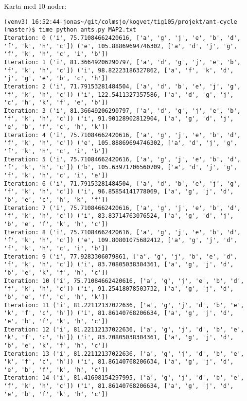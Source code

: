 \documentclass[english,man]{apa6}
\begin{document}
Karta med 10 noder:

\begin{verbatim}
(venv3) 16:52:44-jonas~/git/colmsjo/kogvet/tig105/projekt/ant-cycle (master)$ time python ants.py MAP2.txt
Iteration: 0 ('i', 75.71084662420616, ['a', 'g', 'j', 'e', 'b', 'd', 'f', 'k', 'h', 'c']) ('e', 105.88869694746302, ['a', 'd', 'j', 'g', 'f', 'k', 'h', 'c', 'i', 'b'])
Iteration: 1 ('i', 81.36649206290797, ['a', 'd', 'g', 'j', 'e', 'b', 'f', 'k', 'h', 'c']) ('i', 98.82223186327862, ['a', 'f', 'k', 'd', 'j', 'g', 'e', 'b', 'c', 'h'])
Iteration: 2 ('i', 71.79153281484504, ['a', 'd', 'b', 'e', 'j', 'g', 'f', 'k', 'h', 'c']) ('i', 122.5411327357586, ['a', 'd', 'g', 'j', 'c', 'h', 'k', 'f', 'e', 'b'])
Iteration: 3 ('i', 81.36649206290797, ['a', 'd', 'g', 'j', 'e', 'b', 'f', 'k', 'h', 'c']) ('i', 91.90128902812904, ['a', 'g', 'd', 'j', 'e', 'b', 'f', 'c', 'h', 'k'])
Iteration: 4 ('i', 75.71084662420616, ['a', 'g', 'j', 'e', 'b', 'd', 'f', 'k', 'h', 'c']) ('e', 105.88869694746302, ['a', 'd', 'j', 'g', 'f', 'k', 'h', 'c', 'i', 'b'])
Iteration: 5 ('i', 75.71084662420616, ['a', 'g', 'j', 'e', 'b', 'd', 'f', 'k', 'h', 'c']) ('b', 105.63971706560709, ['a', 'd', 'j', 'g', 'f', 'k', 'h', 'c', 'i', 'e'])
Iteration: 6 ('i', 71.79153281484504, ['a', 'd', 'b', 'e', 'j', 'g', 'f', 'k', 'h', 'c']) ('i', 96.85854141778069, ['a', 'g', 'j', 'd', 'b', 'e', 'c', 'h', 'k', 'f'])
Iteration: 7 ('i', 75.71084662420616, ['a', 'g', 'j', 'e', 'b', 'd', 'f', 'k', 'h', 'c']) ('i', 83.83714763076524, ['a', 'g', 'd', 'j', 'b', 'e', 'f', 'k', 'h', 'c'])
Iteration: 8 ('i', 75.71084662420616, ['a', 'g', 'j', 'e', 'b', 'd', 'f', 'k', 'h', 'c']) ('e', 109.80801075682412, ['a', 'g', 'j', 'd', 'f', 'k', 'h', 'c', 'i', 'b'])
Iteration: 9 ('i', 77.9283306079861, ['a', 'g', 'j', 'b', 'e', 'd', 'f', 'k', 'h', 'c']) ('i', 83.70805038304361, ['a', 'g', 'j', 'd', 'b', 'e', 'k', 'f', 'h', 'c'])
Iteration: 10 ('i', 75.71084662420616, ['a', 'g', 'j', 'e', 'b', 'd', 'f', 'k', 'h', 'c']) ('i', 91.25418078503732, ['a', 'g', 'j', 'd', 'b', 'e', 'f', 'c', 'h', 'k'])
Iteration: 11 ('i', 81.22112137022636, ['a', 'g', 'j', 'd', 'b', 'e', 'k', 'f', 'c', 'h']) ('i', 81.86140768206634, ['a', 'g', 'j', 'd', 'e', 'b', 'f', 'k', 'h', 'c'])
Iteration: 12 ('i', 81.22112137022636, ['a', 'g', 'j', 'd', 'b', 'e', 'k', 'f', 'c', 'h']) ('i', 83.70805038304361, ['a', 'g', 'j', 'd', 'b', 'e', 'k', 'f', 'h', 'c'])
Iteration: 13 ('i', 81.22112137022636, ['a', 'g', 'j', 'd', 'b', 'e', 'k', 'f', 'c', 'h']) ('i', 81.86140768206634, ['a', 'g', 'j', 'd', 'e', 'b', 'f', 'k', 'h', 'c'])
Iteration: 14 ('i', 81.41698154297995, ['a', 'g', 'j', 'd', 'b', 'e', 'f', 'k', 'h', 'c']) ('i', 81.86140768206634, ['a', 'g', 'j', 'd', 'e', 'b', 'f', 'k', 'h', 'c'])

\end{verbatim}
\end{document}
